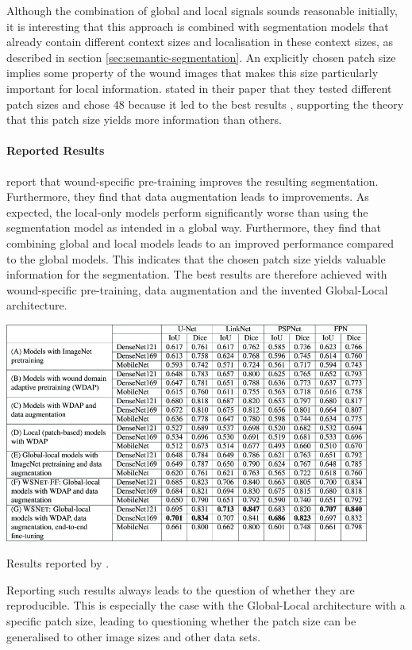 Although the combination of global and local signals sounds reasonable initially, it is interesting that this approach is combined with segmentation models that already contain different context sizes and localisation in these context sizes, as described in section \ref{sec:semantic-segmentation}. An explicitly chosen patch size implies some property of the wound images that makes this size particularly important for local information. \citeauthor{Oota_2023_WACV} stated in their paper that they tested different patch sizes and chose 48 because it led to the best results \cite{Oota_2023_WACV}, supporting the theory that this patch size yields more information than others.


\paragraph{Reported Results}

\citeauthor{Oota_2023_WACV} report that wound-specific pre-training improves the resulting segmentation. Furthermore, they find that data augmentation leads to improvements. As expected, the local-only models perform significantly worse than using the segmentation model as intended in a global way. Furthermore, they find that combining global and local models leads to an improved performance compared to the global models. This indicates that the chosen patch size yields valuable information for the segmentation. The best results are therefore achieved with wound-specific pre-training, data augmentation and the invented Global-Local architecture.

\begin{table}[htb!]
	\centering
	\includegraphics[width=0.9\textwidth]{fig/wsnet-results.png}
	\caption{Results reported by \citeauthor{Oota_2023_WACV} \cite{Oota_2023_WACV}.}
	\label{table:results-wsnet}
\end{table}

Reporting such results always leads to the question of whether they are reproducible. This is especially the case with the Global-Local architecture with a specific patch size, leading to questioning whether the patch size can be generalised to other image sizes and other data sets.



